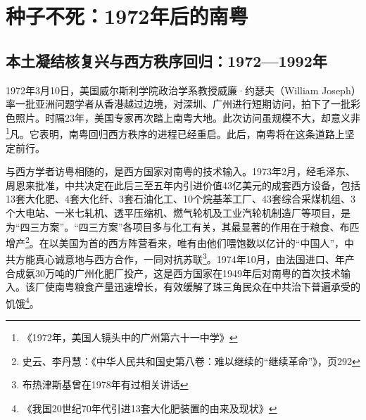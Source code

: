 \chapter{种子不死：1972年后的南粤}

\section{本土凝结核复兴与西方秩序回归：1972—1992年}

\indent 1972年3月10日，美国威尔斯利学院政治学系教授威廉·约瑟夫（William Joseph）率一批亚洲问题学者从香港越过边境，对深圳、广州进行短期访问，拍下了一批彩色照片。时隔23年，美国专家再次踏上南粤大地。此次访问虽规模不大，却意义非\footnote{《1972年，美国人镜头中的广州第六十一中学》}凡。它表明，南粤回归西方秩序的进程已经重启。此后，南粤将在这条道路上坚定前行。

与西方学者访粤相随的，是西方国家对南粤的技术输入。1973年2月，经毛泽东、周恩来批准，中共决定在此后三至五年内引进价值43亿美元的成套西方设备，包括13套大化肥、4套大化纤、3套石油化工、10个烷基苯工厂、43套综合采煤机组、3个大电站、一米七轧机、透平压缩机、燃气轮机及工业汽轮机制造厂等项目，是为“四三方案”。“四三方案”各项目多与化工有关，其最显著的作用在于粮食、布匹增产\footnote{史云、李丹慧：《中华人民共和国史第八卷：难以继续的“继续革命”》，页292}。在以美国为首的西方阵营看来，唯有由他们喂饱数以亿计的“中国人”，中共方能真心诚意地与西方合作，一同对抗苏联\footnote{布热津斯基曾在1978年有过相关讲话}。1974年10月，由法国进口、年产合成氨30万吨的广州化肥厂投产，这是西方国家在1949年后对南粤的首次技术输入。该厂使南粤粮食产量迅速增长，有效缓解了珠三角民众在中共治下普遍承受的饥饿\footnote{《我国20世纪70年代引进13套大化肥装置的由来及现状》}。

